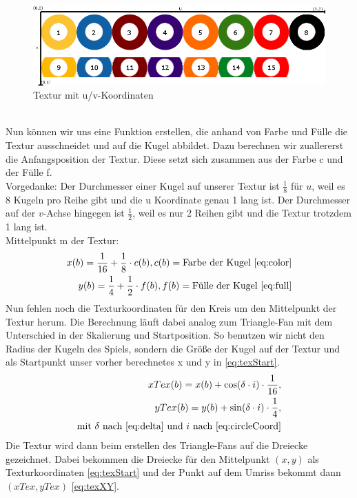 	\begin{figure}[h]
		\caption{Textur mit u/v-Koordinaten}
		\includegraphics[width=\textwidth]{bilder/ballsachsen}
	\end{figure} \\
	Nun können wir uns eine Funktion erstellen, die anhand von Farbe und Fülle die Textur ausschneidet und auf die Kugel abbildet. 
	Dazu berechnen wir zuallererst die Anfangsposition der Textur. 
	Diese setzt sich zusammen aus der Farbe c und der Fülle f. \\
	Vorgedanke: Der Durchmesser einer Kugel auf unserer Textur ist $\frac{1}{8}$ für $u$, weil es 8 Kugeln pro Reihe gibt und die u Koordinate genau 1 lang ist. Der Durchmesser auf der $v$-Achse hingegen ist $\frac{1}{2}$, weil es nur 2 Reihen gibt und die Textur trotzdem 1 lang ist. \\
	Mittelpunkt m der Textur: \\
	\begin{equation}\label{eq:texStart}
	\begin{aligned} 
		x(b) = \frac{1}{16} + \frac{1}{8} \cdot c(b), c(b) = \text{Farbe der Kugel \eqref{eq:color}} \\
		y(b) = \frac{1}{4} + \frac{1}{2} \cdot f(b), f(b) = \text{Fülle der Kugel \eqref{eq:full}}
	\end{aligned}
	\end{equation}
	Nun fehlen noch die Texturkoordinaten für den Kreis um den Mittelpunkt der Textur herum.
	Die Berechnung läuft dabei analog zum Triangle-Fan mit dem Unterschied in der Skalierung und Startposition. 
	So benutzen wir nicht den Radius der Kugeln des Spiels, sondern die Größe der Kugel auf der Textur und als Startpunkt unser vorher berechnetes x und y in \eqref{eq:texStart}. 
	\begin{equation}\label{eq:texXY}
	\begin{aligned}
		 xTex(b) =  x(b) + \cos(\delta \cdot i) \cdot \frac{1}{16}, \\
		 yTex(b) =  y(b) + \sin(\delta \cdot i) \cdot \frac{1}{4}, \\
		\text{mit } \delta \text{ nach }\eqref{eq:delta} \text{ und } i \text{ nach } \eqref{eq:circleCoord}
	\end{aligned}
	\end{equation}
	Die Textur wird dann beim erstellen des Triangle-Fans auf die Dreiecke gezeichnet. Dabei bekommen die Dreiecke für den Mittelpunkt $(x,y)$ als Texturkoordinaten \eqref{eq:texStart} und der Punkt auf dem Umriss bekommt dann $(xTex,yTex)$ \eqref{eq:texXY}.
